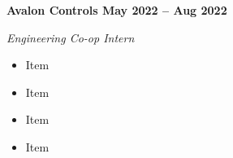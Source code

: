 \vspace{0.1cm}
\textbf{Avalon Controls \hfill May 2022 -- Aug 2022} \par
\textit{Engineering Co-op Intern} \par
\begin{itemize}
	\item Item
  \item Item
  \item Item
  \item Item
\end{itemize} \par